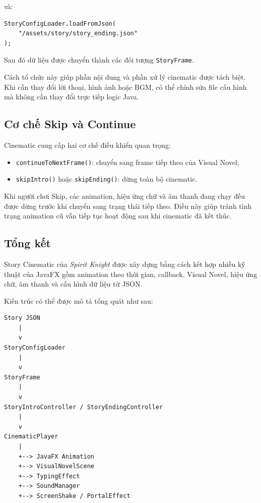 \documentclass[12pt,a4paper]{report}
\begin{document}
    và:

    \begin{verbatim}
StoryConfigLoader.loadFromJson(
    "/assets/story/story_ending.json"
);
    \end{verbatim}

    Sau đó dữ liệu được chuyển thành các đối tượng
    \texttt{StoryFrame}.

    Cách tổ chức này giúp phần nội dung và phần xử lý cinematic
    được tách biệt. Khi cần thay đổi lời thoại, hình ảnh hoặc BGM,
    có thể chỉnh sửa file cấu hình mà không cần thay đổi trực tiếp
    logic Java.

    \subsection{Cơ chế Skip và Continue}

    Cinematic cung cấp hai cơ chế điều khiển quan trọng:

    \begin{itemize}
        \item \texttt{continueToNextFrame()}:
        chuyển sang frame tiếp theo của Visual Novel;
        \item \texttt{skipIntro()} hoặc \texttt{skipEnding()}:
        dừng toàn bộ cinematic.
    \end{itemize}

    Khi người chơi Skip, các animation, hiệu ứng chữ và âm thanh
    đang chạy đều được dừng trước khi chuyển sang trạng thái tiếp theo.
    Điều này giúp tránh tình trạng animation cũ vẫn tiếp tục hoạt động
    sau khi cinematic đã kết thúc.

    \subsection{Tổng kết}

    Story Cinematic của \textit{Spirit Knight} được xây dựng bằng cách
    kết hợp nhiều kỹ thuật của JavaFX gồm animation theo thời gian,
    callback, Visual Novel, hiệu ứng chữ, âm thanh và cấu hình dữ liệu
    từ JSON.

    Kiến trúc có thể được mô tả tổng quát như sau:

    \begin{verbatim}
Story JSON
    |
    v
StoryConfigLoader
    |
    v
StoryFrame
    |
    v
StoryIntroController / StoryEndingController
    |
    v
CinematicPlayer
    |
    +--> JavaFX Animation
    +--> VisualNovelScene
    +--> TypingEffect
    +--> SoundManager
    +--> ScreenShake / PortalEffect
    \end{verbatim}
\end{document}
